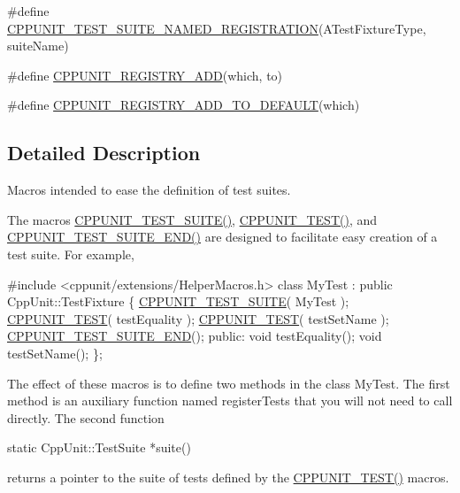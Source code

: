 \begin{DoxyCompactItemize}
\#define \hyperlink{group___creating_test_suite_ga028a5855a40ad3836e2a26aa48cd4c91}{C\+P\+P\+U\+N\+I\+T\+\_\+\+T\+E\+S\+T\+\_\+\+S\+U\+I\+T\+E\+\_\+\+N\+A\+M\+E\+D\+\_\+\+R\+E\+G\+I\+S\+T\+R\+A\+T\+I\+O\+N}(A\+Test\+Fixture\+Type, suite\+Name)
\item 
\#define \hyperlink{group___creating_test_suite_ga0785e2e8a821f70c69a8127c35c0a667}{C\+P\+P\+U\+N\+I\+T\+\_\+\+R\+E\+G\+I\+S\+T\+R\+Y\+\_\+\+A\+D\+D}(which, to)
\item 
\#define \hyperlink{group___creating_test_suite_ga9c3be3389213e1dc823ed580cc60878f}{C\+P\+P\+U\+N\+I\+T\+\_\+\+R\+E\+G\+I\+S\+T\+R\+Y\+\_\+\+A\+D\+D\+\_\+\+T\+O\+\_\+\+D\+E\+F\+A\+U\+L\+T}(which)
\end{DoxyCompactItemize}


\subsection{Detailed Description}
Macros intended to ease the definition of test suites.

The macros \hyperlink{group___writing_test_fixture_gabe1e12200f40d6f25d60c1783c99da81}{C\+P\+P\+U\+N\+I\+T\+\_\+\+T\+E\+S\+T\+\_\+\+S\+U\+I\+T\+E()}, \hyperlink{group___writing_test_fixture_gaac9b03d898b207e1daf2f93867935a96}{C\+P\+P\+U\+N\+I\+T\+\_\+\+T\+E\+S\+T()}, and \hyperlink{group___writing_test_fixture_ga601b2e1d525f3947b216e28c625abcb1}{C\+P\+P\+U\+N\+I\+T\+\_\+\+T\+E\+S\+T\+\_\+\+S\+U\+I\+T\+E\+\_\+\+E\+N\+D()} are designed to facilitate easy creation of a test suite. For example,


\begin{DoxyCode}
\textcolor{preprocessor}{#include <cppunit/extensions/HelperMacros.h>}
\textcolor{keyword}{class }MyTest : \textcolor{keyword}{public} CppUnit::TestFixture \{
  \hyperlink{group___writing_test_fixture_gabe1e12200f40d6f25d60c1783c99da81}{CPPUNIT\_TEST\_SUITE}( MyTest );
  \hyperlink{group___writing_test_fixture_gaac9b03d898b207e1daf2f93867935a96}{CPPUNIT\_TEST}( testEquality );
  \hyperlink{group___writing_test_fixture_gaac9b03d898b207e1daf2f93867935a96}{CPPUNIT\_TEST}( testSetName );
  \hyperlink{group___writing_test_fixture_ga601b2e1d525f3947b216e28c625abcb1}{CPPUNIT\_TEST\_SUITE\_END}();
\textcolor{keyword}{public}:
  \textcolor{keywordtype}{void} testEquality();
  \textcolor{keywordtype}{void} testSetName();
\};
\end{DoxyCode}


The effect of these macros is to define two methods in the class My\+Test. The first method is an auxiliary function named register\+Tests that you will not need to call directly. The second function 
\begin{DoxyCode}
\textcolor{keyword}{static} CppUnit::TestSuite *suite()
\end{DoxyCode}
 returns a pointer to the suite of tests defined by the \hyperlink{group___writing_test_fixture_gaac9b03d898b207e1daf2f93867935a96}{C\+P\+P\+U\+N\+I\+T\+\_\+\+T\+E\+S\+T()} macros.


